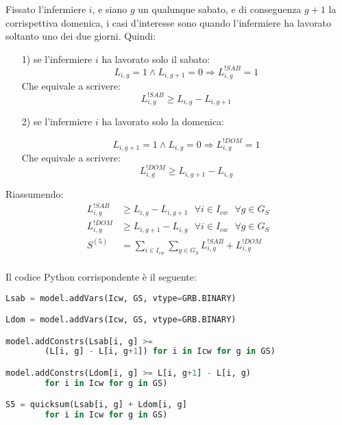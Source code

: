 Fissato l'infermiere $i$, e siano $g$ un qualunque sabato, e di conseguenza $g+1$ la corrispettiva domenica, i casi d'interesse sono quando l'infermiere ha lavorato soltanto uno dei due giorni. Quindi:
\begin{itemize}
\item [1)] se l'infermiere $i$ ha lavorato solo il sabato:
\begin{equation}
L_{i, g} = 1 \wedge L_{i, g+1} = 0 \Longrightarrow L_{i, g}^{!SAB} = 1 
\end{equation}
Che equivale a scrivere:
\begin{equation}
L_{i, g}^{!SAB} \geq L_{i, g} - L_{i, g+1}
\end{equation}

\item [2)] se l'infermiere $i$ ha lavorato solo la domenica:

\begin{equation}
L_{i, g+1} = 1 \wedge L_{i, g} = 0 \Longrightarrow L_{i, g}^{!DOM} = 1 
\end{equation}
Che equivale a scrivere:
\begin{equation}
L_{i, g}^{!DOM} \geq L_{i, g+1} - L_{i, g}
\end{equation}
\end{itemize}

Riassumendo:
\begin{equation}
\begin{split}
L_{i, g}^{!SAB} &\geq L_{i, g} - L_{i, g+1}  ~~~ \forall i \in I_{cw} ~~~ \forall g \in G_S \\
L_{i, g}^{!DOM} &\geq L_{i, g+1} - L_{i, g} ~~~ \forall i \in I_{cw} ~~~ \forall g \in G_S \\
S^{(5)} &= \sum_{i \in I_{cw}} \sum_{g \in G_S} L_{i, g}^{!SAB} + L_{i, g}^{!DOM} \\
\end{split}
\end{equation}

Il codice Python corrispondente è il seguente:
\begin{lstlisting}[language=Python]
Lsab = model.addVars(Icw, GS, vtype=GRB.BINARY)

Ldom = model.addVars(Icw, GS, vtype=GRB.BINARY)

model.addConstrs(Lsab[i, g] >= 
		(L[i, g] - L[i, g+1]) for i in Icw for g in GS)

model.addConstrs(Ldom[i, g] >= L[i, g+1] - L[i, g) 
		for i in Icw for g in GS)

S5 = quicksum(Lsab[i, g] + Ldom[i, g] 
		for i in Icw for g in GS)
\end{lstlisting}

